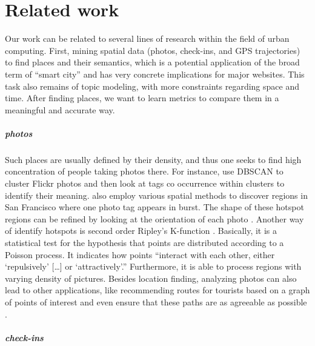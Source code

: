 \chapter{Related work}
\label{chap:related}

Our work can be related to several lines of research within the field of urban
computing. First, mining spatial data (photos, check-ins, and GPS
trajectories) to find places and their semantics, which is a potential
application of the broad term of \enquote{smart city} and has very concrete
implications for major websites. This task also remains of topic modeling,
with more constraints regarding space and time. After finding places, we want
to learn metrics to compare them in a meaningful and accurate way.

\paragraph{photos}

Such places are usually defined by their density, and thus one seeks to find
high concentration of people taking photos there. For instance,
\textcite{Deng2009} use \textsc{DBSCAN} to cluster Flickr photos and then look
at tags co occurrence within clusters to identify their meaning.
\Textcite{Rattenbury2009} also employ various spatial methods to discover
regions in San Francisco where one photo tag appears in burst. The shape of
these hotspot regions can be refined by looking at the orientation of each
photo \autocite{Hotspots12}. Another way of identify hotspots is second order
Ripley's K-function \autocite{TagHotspot12}. Basically, it is a statistical
test for the hypothesis that points are distributed according to a Poisson
process. It indicates how points \enquote{interact with each other, either
\enquote{repulsively} [\dots] or \enquote{attractively}.} Furthermore, it is
able to process regions with varying density of pictures. Besides location
finding, analyzing photos can also lead to other applications, like
recommending routes for tourists based on a graph of points of interest
\autocite{CityItineraries10} and even ensure that these paths are as agreeable
as possible \autocite{Quercia2014}.

\paragraph{check-ins}

